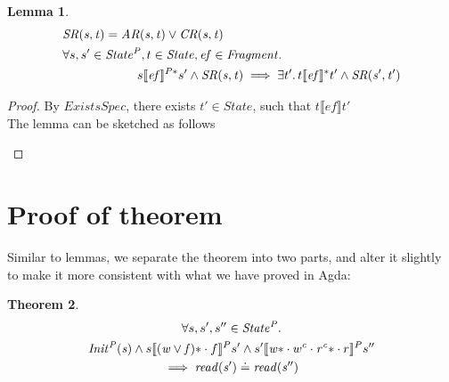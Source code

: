 \documentclass[a4paper,11pt]{article}
\newtheorem{theorem}{Theorem}[section]
\newtheorem{lemma}[theorem]{Lemma}
\theoremstyle{definition}
\begin{document}
\begin{lemma}
	\begin{align*}
		&\mathit{SR(s, t)} = \mathit{AR(s, t)} \lor \mathit{CR(s, t)}\\
		&\forall s, s' \in \mathit{State^P}, t \in \mathit{State}, \mathit{ef} \in \mathit{Fragment} \ldotp\\
		&\qquad \qquad \qquad s \llbracket \mathit{ef} \rrbracket^{P*} s'  \land \mathit{SR(s, t)} \implies \exists t' \ldotp t\llbracket \mathit{ef} \rrbracket^* t' \land \mathit{SR(s', t')} \\
	\end{align*}
\end{lemma}
\begin{proof}
	By $\mathit{ExistsSpec}$, there exists $t' \in State$, such that $t \llbracket \mathit{ef} \rrbracket t'$\\
	The lemma can be sketched as follows
	\begin{figure} [h] \centering
{}
	\end{figure}
\end{proof}

\section{Proof of theorem}

Similar to lemmas, we separate the theorem into two parts, and alter it slightly to make it more consistent with what we have proved in Agda:

\begin{theorem}
\begin{multline*}
      \forall s, s', s'' \in \mathit{State^P} \ldotp\\\mathit{Init^P(s)} \land s \llbracket \mathit{(w \lor f)\ast} \cdot f \rrbracket^P s' \land s' \llbracket \mathit{w\ast} \cdot w^c \cdot \mathit{r^c\ast} \cdot r \rrbracket^P s'' \\ \implies \mathit{read(s')} \doteq \mathit{read(s'')}
\end{multline*}
\end{theorem}
\end{document}

